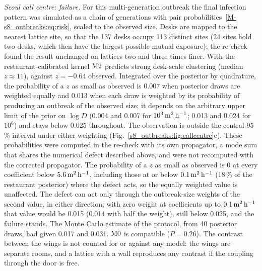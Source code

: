 \emph{Seoul call centre: failure.} For this multi-generation outbreak the final infection pattern was
simulated as a chain of generations with pair probabilities~\eqref{M-s8_outbreaks:eq:risk}, scaled to the
observed size. Desks are mapped to the nearest lattice site, so that the 137 desks occupy 113 distinct sites
(24 sites hold two desks, which then have the largest possible mutual exposure); the re-check found the
result unchanged on lattices two and three times finer.
With the restaurant-calibrated kernel $\mathrm{M2}$ predicts strong desk-scale clustering (median
$z\approx11$), against $z=-0.64$ observed. Integrated over the posterior by quadrature, the probability of a
$z$ as small as observed is 0.007 when posterior draws are weighted equally and 0.013 when each draw is
weighted by its probability of producing an outbreak of the observed size; it depends on the arbitrary upper limit of the prior on $\log D$
(0.004 and 0.007 for $10^{3}\,\mathrm{m}^2\,\mathrm{h}^{-1}$; 0.013 and 0.024 for $10^{6}$) and stays below 0.025 throughout. The
observation is outside the central 95\,\% interval under either weighting
(Fig.~\ref{s8_outbreaks:fig:callcentre}c). These probabilities were computed in the re-check with its own
propagator, a mode sum that shares the numerical defect described above, and were not recomputed with the
corrected propagator. The probability of a $z$ as small as observed is 0 at every coefficient below
$5.6\,\mathrm{m}^2\,\mathrm{h}^{-1}$, including those at or below $0.1\,\mathrm{m}^2\,\mathrm{h}^{-1}$ (18\,\% of the restaurant posterior) where the defect acts,
so the equally weighted value is unaffected. The defect can act only through the outbreak-size weights of the
second value, in either direction; with zero weight at coefficients up to $0.1\,\mathrm{m}^2\,\mathrm{h}^{-1}$ that value would be 0.015
(0.014 with half the weight), still below 0.025, and the failure stands. The Monte Carlo estimate of the protocol, from 40 posterior draws, had given 0.017 and
0.031. $\mathrm{M0}$ is compatible ($P=0.26$). The contrast between the
wings is not counted for or against any model: the wings are separate rooms, and a lattice with a wall
reproduces any contrast if the coupling through the door is free.


